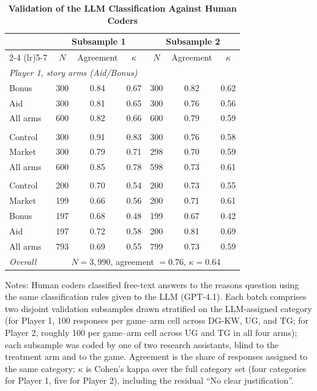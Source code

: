 \begin{table}[!htbp]
\centering
\caption{\textbf{Validation of the LLM Classification Against Human Coders}}
\label{tab:llm_human_agreement}
\begin{tabular}{lcccccc}
\toprule
 & \multicolumn{3}{c}{Subsample 1} & \multicolumn{3}{c}{Subsample 2} \\
\cmidrule(lr){2-4} \cmidrule(lr){5-7}
 & $N$ & Agreement & $\kappa$ & $N$ & Agreement & $\kappa$ \\
\midrule
\multicolumn{7}{l}{\emph{Player 1, story arms (Aid/Bonus)}} \\
\quad Bonus & 300 & 0.84 & 0.67 & 300 & 0.82 & 0.62 \\
\quad Aid & 300 & 0.81 & 0.65 & 300 & 0.76 & 0.56 \\
\quad All arms & 600 & 0.82 & 0.66 & 600 & 0.79 & 0.59 \\
\addlinespace
\multicolumn{7}{l}{\emph{Player 1, Market/Control}} \\
\quad Control & 300 & 0.91 & 0.83 & 300 & 0.76 & 0.58 \\
\quad Market & 300 & 0.79 & 0.71 & 298 & 0.70 & 0.59 \\
\quad All arms & 600 & 0.85 & 0.78 & 598 & 0.73 & 0.61 \\
\addlinespace
\multicolumn{7}{l}{\emph{Player 2, all arms}} \\
\quad Control & 200 & 0.70 & 0.54 & 200 & 0.73 & 0.55 \\
\quad Market & 199 & 0.66 & 0.56 & 200 & 0.71 & 0.61 \\
\quad Bonus & 197 & 0.68 & 0.48 & 199 & 0.67 & 0.42 \\
\quad Aid & 197 & 0.72 & 0.58 & 200 & 0.81 & 0.69 \\
\quad All arms & 793 & 0.69 & 0.55 & 799 & 0.73 & 0.59 \\
\addlinespace
\emph{Overall} & \multicolumn{6}{c}{$N=3,990$, agreement $=0.76$, $\kappa=0.64$} \\
\bottomrule
\end{tabular}
\begin{flushleft}
\footnotesize Notes: Human coders classified free-text answers to the reasons question using the same classification rules given to the LLM (GPT-4.1). Each batch comprises two disjoint validation subsamples drawn stratified on the LLM-assigned category (for Player 1, 100 responses per game--arm cell across DG-KW, UG, and TG\@; for Player 2, roughly 100 per game--arm cell across UG and TG in all four arms); each subsample was coded by one of two research assistants, blind to the treatment arm and to the game. Agreement is the share of responses assigned to the same category; $\kappa$ is Cohen's kappa over the full category set (four categories for Player 1, five for Player 2), including the residual ``No clear justification''.
\end{flushleft}
\end{table}
